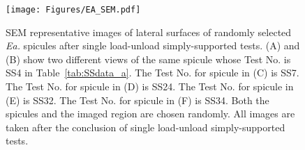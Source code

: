 \begin{figure}[H]
\centering
\texttt{[image: Figures/EA\_SEM.pdf]}
\caption{SEM representative images of lateral surfaces of randomly selected \textit{Ea.} spicules after single load-unload simply-supported tests.
(\textsf{A}) and (\textsf{B}) show two different views of the same spicule whose Test No. is SS4 in Table~\ref{tab:SSdata_a}.
The Test No. for spicule in (\textsf{C}) is SS7.
The Test No. for spicule in (\textsf{D}) is SS24.
The Test No. for spicule in (\textsf{E}) is SS32.
The Test No. for spicule in (\textsf{F}) is SS34.
Both the spicules and the imaged region are chosen randomly.
All images are taken after the conclusion of single load-unload simply-supported tests.
}
\label{fig:SEM}
\end{figure}
